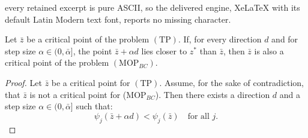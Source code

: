 \documentclass[10pt,a4paper]{amsart}
\newcommand{\obj}[1]{\psi_{#1}}               %
\newcommand{\xlm}{z^*}                    %
\begin{document}
every retained excerpt is pure ASCII, so the delivered engine, XeLaTeX with its default Latin Modern text font, reports no missing character.
\begin{Theorem}\label{theorem_3.1}
Let $\bar{z}$ be a critical point of the problem $(\mathrm{TP})$. 
If, for every direction $d$ and for step size $\alpha \in (0, \bar{\alpha}]$, 
the point $\bar{z} + \alpha d$ lies closer to $\xlm$ than $\bar{z}$, 
then $\bar{z}$ is also a critical point of the problem $(\mathrm{MOP}_{BC})$.
\end{Theorem}

\begin{proof}


Let $\bar{z}$ be a critical point for $(\mathrm{TP})$.  
Assume, for the sake of contradiction, that $\bar{z}$ is not a critical point for (MOP$_{BC}$).  
Then there exists a direction $d$ and a step size $\alpha \in (0, \bar{\alpha}]$ such that:
\[
\obj{j}(\bar{z} + \alpha d) < \obj{j}(\bar{z}) \quad \text{for all } j.
\]


\end{proof}
\end{document}
